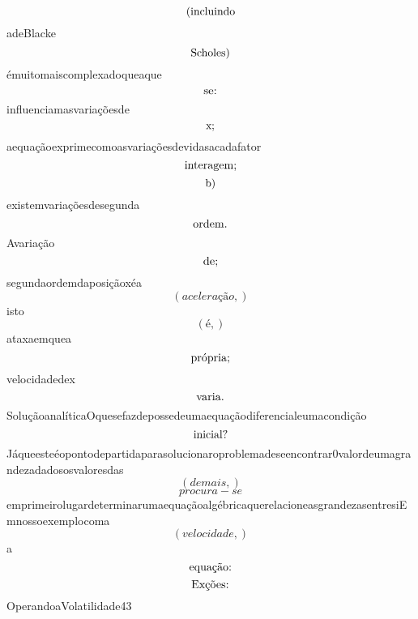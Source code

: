 \documentclass{article}
\begin{document}
\begin{equation}
$(incluindo$
\end{equation}adeBlacke\begin{equation}
$Scholes)$
\end{equation}émuitomaiscomplexadoqueaque\begin{equation}
$se:$
\end{equation}influenciamasvariaçõesde\begin{equation}
$x;$
\end{equation}aequaçãoexprimecomoasvariaçõesdevidasacadafator\begin{equation}
$interagem;$
\end{equation}\begin{equation}
$b)$
\end{equation}existemvariaçõesdesegunda\begin{equation}
$ordem.$
\end{equation}Avariação\begin{equation}
$de;$
\end{equation}segundaordemdaposiçãoxéa\begin{equation}
\left( aceleração,\right)
\end{equation}isto\begin{equation}
\left( é,\right)
\end{equation}ataxaemquea\begin{equation}
$própria;$
\end{equation}velocidadedex\begin{equation}
$varia.$
\end{equation}SoluçãoanalíticaOquesefazdepossedeumaequaçãodiferencialeumacondição\begin{equation}
$inicial?$
\end{equation}Jáqueesteéopontodepartidaparasolucionaroproblemadeseencontrar0valordeumagrandezadadososvaloresdas\begin{equation}
\left( demais,\right)
\end{equation}\begin{equation}
procura - se
\end{equation}emprimeirolugardeterminarumaequaçãoalgébricaquerelacioneasgrandezasentresiEmnossoexemplocoma\begin{equation}
\left( velocidade,\right)
\end{equation}a\begin{equation}
$equação:$
\end{equation}\begin{equation}
$Exções:$
\end{equation}OperandoaVolatilidade43\begin{equation}

\end{equation}
\end{document}
